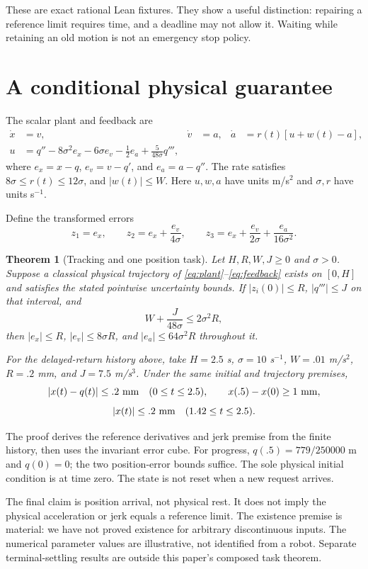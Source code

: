 \documentclass[10pt,letterpaper]{article}
\newtheorem{theorem}{Theorem}
\begin{document}
These are exact rational Lean fixtures. They show a useful distinction:
repairing a reference limit requires time, and a deadline may not allow it.
Waiting while retaining an old motion is not an emergency stop policy.

\section{A conditional physical guarantee}
The scalar plant and feedback are
\begin{align}
 \dot x&=v,& \dot v&=a,& \dot a&=r(t)[u+w(t)-a],\label{eq:plant}\\
 u&=q''-8\sigma^2e_x-6\sigma e_v-\tfrac12e_a
       +\frac5{48\sigma}q''',\label{eq:feedback}
\end{align}
where $e_x=x-q$, $e_v=v-q'$, and $e_a=a-q''$. The rate satisfies
$8\sigma\leq r(t)\leq12\sigma$, and $|w(t)|\leq W$. Here $u,w,a$ have units
m/s$^2$ and $\sigma,r$ have units s$^{-1}$.

Define the transformed errors
\[
 z_1=e_x,\qquad z_2=e_x+\frac{e_v}{4\sigma},\qquad
 z_3=e_x+\frac{e_v}{2\sigma}+\frac{e_a}{16\sigma^2}.
\]
\begin{theorem}[Tracking and one position task]\label{thm:physical}
Let $H,R,W,J\geq0$ and $\sigma>0$.
Suppose a classical physical trajectory of
\eqref{eq:plant}--\eqref{eq:feedback} exists on $[0,H]$ and satisfies the stated
pointwise uncertainty bounds. If $|z_i(0)|\leq R$, $|q'''|\leq J$ on that interval,
and
\[
 W+\frac{J}{48\sigma}\leq2\sigma^2R,
\]
then $|e_x|\leq R$, $|e_v|\leq8\sigma R$, and $|e_a|\leq64\sigma^2R$ throughout it.

For the delayed-return history above, take $H=2.5$ s, $\sigma=10$ s$^{-1}$,
$W=.01$ m/s$^2$, $R=.2$ mm, and $J=7.5$ m/s$^3$. Under the same initial and
trajectory premises,
\[
 |x(t)-q(t)|\leq.2\ {\rm mm}\quad(0\leq t\leq2.5),
 \qquad x(.5)-x(0)\geq1\ {\rm mm},
\]
\[
 |x(t)|\leq.2\ {\rm mm}\quad(1.42\leq t\leq2.5).
\]
\end{theorem}
The proof derives the reference derivatives and jerk premise from the finite
history, then uses the invariant error cube. For progress,
$q(.5)=779/250000$ m and $q(0)=0$; the two position-error bounds suffice.
The sole physical initial condition is at time zero. The state is not reset
when a new request arrives.

The final claim is position arrival, not physical rest. It does not imply the
physical acceleration or jerk equals a reference limit. The existence premise
is material: we have not proved existence for arbitrary discontinuous inputs.
The numerical parameter values are illustrative, not identified from a robot.
Separate terminal-settling results are outside this paper's composed task
theorem.
\end{document}
